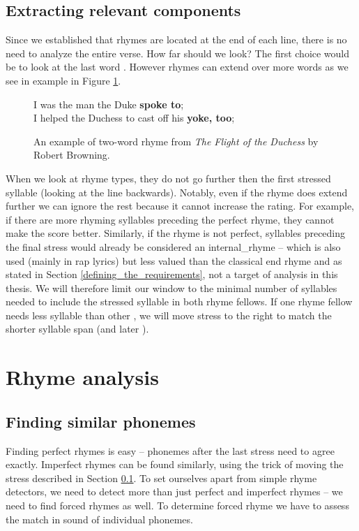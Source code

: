 \subsection{Extracting relevant components}\label{extracting_relevant_phonemes}
Since we established that rhymes are located at the end of each line, there is no need to analyze the entire verse. How far should we look? The first choice would be to look at the last word . However rhymes can extend over more words as we see in example in Figure \ref{two-word_rhyme}.
\begin{figure}[htb]\centering
	I was the man the Duke \textbf{spoke to};\\
	I helped the Duchess to cast off his \textbf{yoke, too};\\
	\caption{An example of two-word rhyme from \textit{The Flight of the Duchess} by Robert Browning.} 
	\label{two-word_rhyme}
\end{figure} 

When we look at rhyme types, they do not go further then the first stressed syllable (looking at the line backwards). Notably, even if the rhyme does extend further we can ignore the rest because it cannot increase the rating. For example, if there are more rhyming syllables preceding the perfect rhyme, they cannot make the score better. Similarly, if the rhyme is not perfect, syllables preceding the final stress would already be considered an \gls{internal_rhyme} -- which is also used (mainly in rap lyrics) but less valued than the classical end rhyme and as stated in Section \ref{defining_the_requirements}, not a target of analysis in this thesis. We will therefore limit our window to the minimal number of syllables needed to include the stressed syllable in both rhyme fellows. If one rhyme fellow needs less syllable than  other , we will move stress to the right to match the shorter syllable span (and later ).


\section{Rhyme analysis}
\subsection{Finding similar phonemes}
Finding perfect rhymes is easy -- phonemes after the last stress need to agree exactly. Imperfect rhymes can be found similarly, using the trick of moving the stress described in Section \ref{extracting_relevant_phonemes}.
To set ourselves apart from simple rhyme detectors, we need to detect more than just perfect and imperfect rhymes -- we need to find forced rhymes as well. To determine forced rhyme we have to assess the match in sound of individual phonemes.

